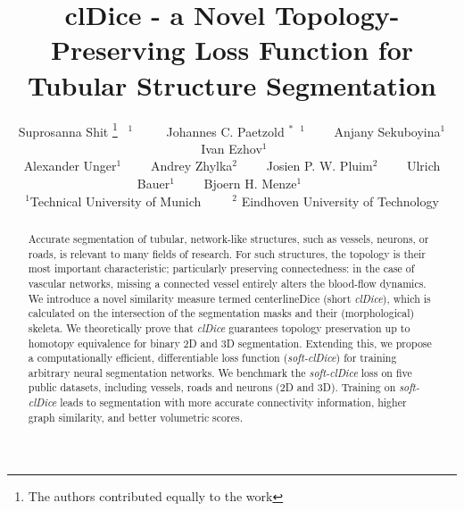\documentclass[final]{cvpr}
\begin{document}

\title{clDice - a Novel Topology-Preserving Loss Function for Tubular Structure Segmentation}

\author{Suprosanna Shit \thanks{The authors contributed equally to the work} ~$^{1}$ ~~~~
Johannes C. Paetzold $^\ast$~$^{1}$~~~~
Anjany Sekuboyina$^{1}$~~~~
Ivan Ezhov$^{1}$~~~~\\
Alexander Unger$^{1}$~~~~
Andrey Zhylka$^{2}$~~~~
Josien P. W. Pluim$^{2}$~~~~
Ulrich Bauer$^{1}$~~~~
Bjoern H. Menze$^{1}$~~~~\\
\hfil$^{1}$Technical University of Munich~~~~~$^{2}$ Eindhoven University of Technology\vspace{0.1cm}
}

\maketitle
\begin{abstract} Accurate segmentation of tubular, network-like structures, such as vessels, neurons, or roads, is relevant to many fields of research. For such structures, the topology is their most important characteristic; particularly preserving connectedness: in the case of vascular networks, missing a connected vessel entirely alters the blood-flow dynamics. We introduce a novel similarity measure termed centerlineDice (short \textit{clDice}), which is calculated on the intersection of the segmentation masks and their (morphological) skeleta. We theoretically prove that \textit{clDice} guarantees topology preservation up to homotopy equivalence for binary 2D and 3D segmentation. Extending this, we propose a computationally efficient, differentiable loss function (\textit{soft-clDice}) for training arbitrary neural segmentation networks. We benchmark the \textit{soft-clDice} loss on five public datasets, including vessels, roads and neurons (2D and 3D). Training on \textit{soft-clDice} leads to segmentation with more accurate connectivity information, higher graph similarity, and better volumetric scores.
\end{abstract}









\clearpage
{\small


}

\clearpage
\appendix

\end{document}
